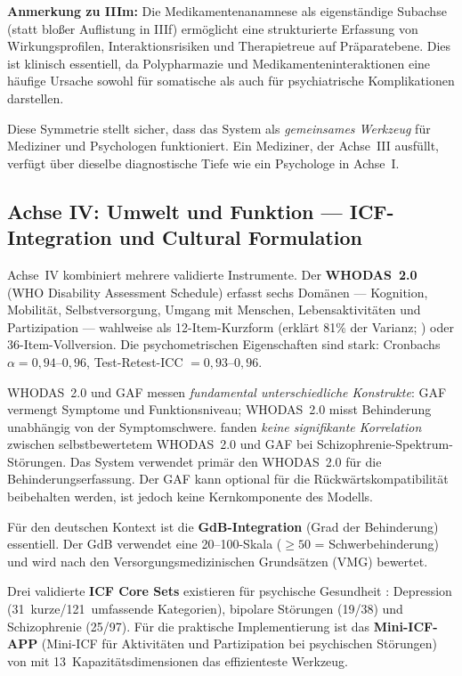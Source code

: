 \documentclass[11pt,a4paper]{article}
\begin{document}
\textbf{Anmerkung zu IIIm:} Die Medikamentenanamnese als eigenst\"andige Subachse (statt blo\ss{}er Auflistung in IIIf) erm\"oglicht eine strukturierte Erfassung von Wirkungsprofilen, Interaktionsrisiken und Therapietreue auf Pr\"aparatebene. Dies ist klinisch essentiell, da Polypharmazie und Medikamenteninteraktionen eine h\"aufige Ursache sowohl f\"ur somatische als auch f\"ur psychiatrische Komplikationen darstellen.

Diese Symmetrie stellt sicher, dass das System als \textit{gemeinsames Werkzeug} f\"ur Mediziner und Psychologen funktioniert. Ein Mediziner, der Achse~III ausf\"ullt, verf\"ugt \"uber dieselbe diagnostische Tiefe wie ein Psychologe in Achse~I.

\subsection{Achse IV: Umwelt und Funktion --- ICF-Integration und Cultural Formulation}
\label{sec:achse4}

Achse~IV kombiniert mehrere validierte Instrumente. Der \textbf{WHODAS~2.0} \citep{WHO2010} (WHO Disability Assessment Schedule) erfasst sechs Dom\"anen --- Kognition, Mobilit\"at, Selbstversorgung, Umgang mit Menschen, Lebensaktivit\"aten und Partizipation --- wahlweise als 12-Item-Kurzform (erkl\"art 81\% der Varianz; \citealp{Luciano2010}) oder 36-Item-Vollversion. Die psychometrischen Eigenschaften sind stark: Cronbachs $\alpha = 0{,}94$--$0{,}96$, Test-Retest-ICC $= 0{,}93$--$0{,}96$.

WHODAS~2.0 und GAF messen \textit{fundamental unterschiedliche Konstrukte}: GAF vermengt Symptome und Funktionsniveau; WHODAS~2.0 misst Behinderung unabh\"angig von der Symptomschwere. \citet{Gspandl2018} fanden \textit{keine signifikante Korrelation} zwischen selbstbewertetem WHODAS~2.0 und GAF bei Schizophrenie-Spektrum-St\"orungen. Das System verwendet prim\"ar den WHODAS~2.0 f\"ur die Behinderungserfassung. Der GAF kann optional f\"ur die R\"uckw\"artskompatibilit\"at beibehalten werden, ist jedoch keine Kernkomponente des Modells.

F\"ur den deutschen Kontext ist die \textbf{GdB-Integration} (Grad der Behinderung) essentiell. Der GdB verwendet eine 20--100-Skala ($\geq 50$ = Schwerbehinderung) und wird nach den Versorgungsmedizinischen Grunds\"atzen (VMG) bewertet.

Drei validierte \textbf{ICF Core Sets} existieren f\"ur psychische Gesundheit \citep{AyusoMateos2010}: Depression (31~kurze/121~umfassende Kategorien), bipolare St\"orungen (19/38) und Schizophrenie (25/97). F\"ur die praktische Implementierung ist das \textbf{Mini-ICF-APP} (Mini-ICF f\"ur Aktivit\"aten und Partizipation bei psychischen St\"orungen) von \citet{LindenBaron2005} mit 13~Kapazit\"atsdimensionen das effizienteste Werkzeug.
\end{document}
